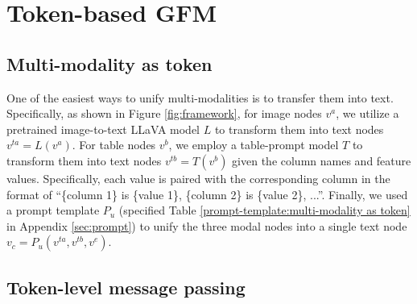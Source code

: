 









\section{Token-based GFM}\label{sec:Token-based GFM}

\subsection{Multi-modality as token} \label{sec:Multi-modal as token}

One of the easiest ways to unify multi-modalities is to transfer them into text. Specifically, as shown in Figure \ref{fig:framework}, for image nodes ${v}^a$, we utilize a pretrained image-to-text LLaVA model \citep{liu2024visual} $L$ to transform them into text nodes ${v}^{ta}=L({v}^a)$. For table nodes ${v}^b$, we employ a table-prompt model $T$ to transform them into text nodes ${v}^{tb}=T({v}^b)$ given the column names and feature values.  Specifically, each
value is paired with the corresponding column in the format
of ``\{column 1\} is \{value 1\}, \{column 2\} is \{value 2\}, ...''. Finally, we used a prompt template $P_{u}$ (specified Table \ref{prompt-template:multi-modality as token} in Appendix \ref{sec:prompt}) to unify the three modal nodes into a single text node $v_c=P_{u}({v}^{ta},{v}^{tb},v^e)$.

\subsection{Token-level message passing} 

